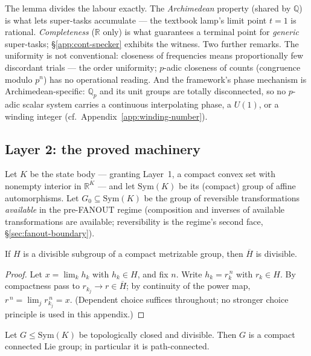 The lemma divides the labour exactly. The \emph{Archimedean} property (shared by
$\mathbb{Q}$) is what lets super-tasks accumulate --- the textbook lamp's limit point
$t=1$ is rational. \emph{Completeness} ($\mathbb{R}$ only) is what guarantees a terminal
point for \emph{generic} super-tasks; \S\ref{app:cont-specker} exhibits the witness. Two
further remarks. The uniformity is not conventional: closeness of frequencies means
proportionally few discordant trials --- the order uniformity; $p$-adic closeness of
counts (congruence modulo $p^n$) has no operational reading. And the framework's
phase mechanism is Archimedean-specific: $\mathbb{Q}_p$ and its unit groups are totally
disconnected, so no $p$-adic scalar system carries a continuous interpolating phase, a
$U(1)$, or a winding integer (cf.\ Appendix~\ref{app:winding-number}).

\subsection{Layer 2: the proved machinery}
\label{app:cont-machinery}

Let $K$ be the state body --- granting Layer~1, a compact convex set with nonempty
interior in $\mathbb{R}^{K}$ --- and let $\mathrm{Sym}(K)$ be its (compact) group of
affine automorphisms. Let $G_0 \subseteq \mathrm{Sym}(K)$ be the group of reversible
transformations \emph{available} in the pre-FANOUT regime (composition and inverses of
available transformations are available; reversibility is the regime's second face,
\S\ref{sec:fanout-boundary}).

\begin{lemma}\label{lem:closure-divisible}
If $H$ is a divisible subgroup of a compact metrizable group, then $\overline{H}$ is
divisible.
\end{lemma}

\begin{proof}
Let $x = \lim_k h_k$ with $h_k \in H$, and fix $n$. Write $h_k = r_k^{\,n}$ with
$r_k \in H$. By compactness pass to $r_{k_j} \to r \in \overline{H}$; by continuity of
the power map, $r^{\,n} = \lim_j r_{k_j}^{\,n} = x$. (Dependent choice suffices
throughout; no stronger choice principle is used in this appendix.)
\end{proof}

\begin{lemma}\label{lem:closedness}
Let $G \le \mathrm{Sym}(K)$ be topologically closed and divisible. Then $G$ is a compact
connected Lie group; in particular it is path-connected.
\end{lemma}

